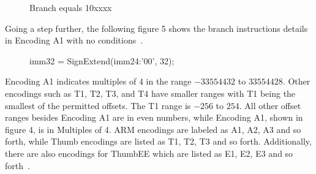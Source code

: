 \documentclass[11pt]{report}
\begin{document}
\begin{center}
\begin{figure}[H] 
\caption{Branch equals 10xxxx}
\end{figure}
\end{center}
\begin{onehalfspace}
Going a step further, the following figure 5 shows the branch instructions details in Encoding A1 with no conditions~\citep[A8-44]{referenceB}.
\end{onehalfspace}
\begin{center}
\begin{figure}[H] 
\caption{imm32 = SignExtend(imm24:'00', 32);}
\end{figure}
\end{center}
\begin{onehalfspace}
Encoding A1 indicates multiples of 4 in the range $-33554432$ to $33554428$. Other encodings such as T1, T2, T3, and T4 have smaller ranges with T1 being the smallest of the permitted offsets. The T1 range is $-256$ to $254$. All other offset ranges besides Encoding A1 are in even numbers, while Encoding A1, shown in figure 4, is in Multiples of 4. ARM encodings are labeled as A1, A2, A3 and so forth, while Thumb encodings are listed as T1, T2, T3 and so forth. Additionally, there are also encodings for ThumbEE which are listed as E1, E2, E3 and so forth~\citep[A8-282]{referenceB}. 
\end{onehalfspace}
\end{document}
